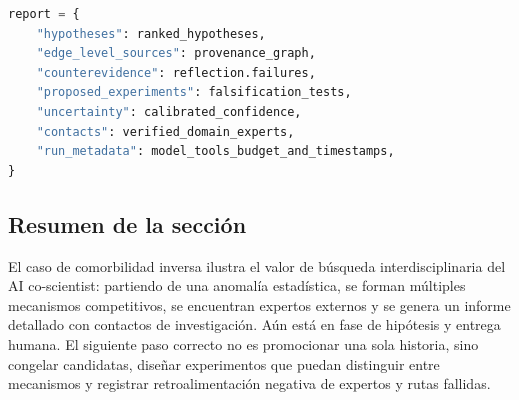 \begin{lstlisting}[language=Python,caption={Estructura de entrega auditable para informes largos}]
report = {
    "hypotheses": ranked_hypotheses,
    "edge_level_sources": provenance_graph,
    "counterevidence": reflection.failures,
    "proposed_experiments": falsification_tests,
    "uncertainty": calibrated_confidence,
    "contacts": verified_domain_experts,
    "run_metadata": model_tools_budget_and_timestamps,
}
\end{lstlisting}

\subsection{Resumen de la sección}

El caso de comorbilidad inversa ilustra el valor de búsqueda interdisciplinaria del AI co-scientist: partiendo de una anomalía estadística, se forman múltiples mecanismos competitivos, se encuentran expertos externos y se genera un informe detallado con contactos de investigación. Aún está en fase de hipótesis y entrega humana. El siguiente paso correcto no es promocionar una sola historia, sino congelar candidatas, diseñar experimentos que puedan distinguir entre mecanismos y registrar retroalimentación negativa de expertos y rutas fallidas.
